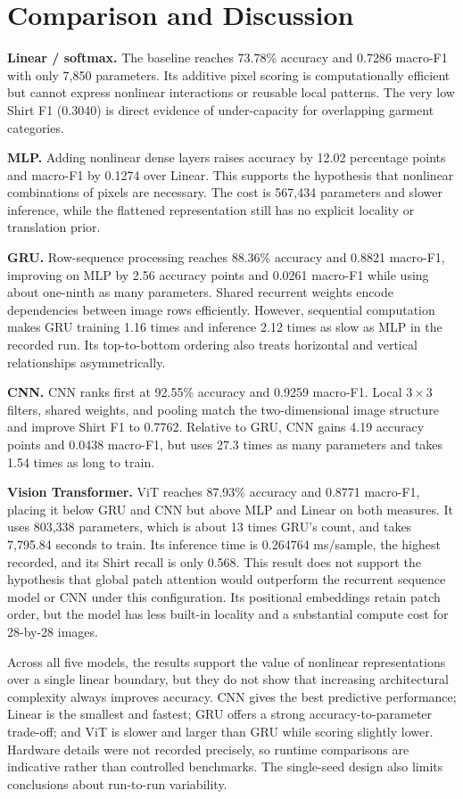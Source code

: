 \section{Comparison and Discussion}

\textbf{Linear / softmax.} The baseline reaches 73.78\% accuracy and 0.7286 macro-F1 with only 7,850 parameters. Its additive pixel scoring is computationally efficient but cannot express nonlinear interactions or reusable local patterns. The very low Shirt F1 (0.3040) is direct evidence of under-capacity for overlapping garment categories.

\textbf{MLP.} Adding nonlinear dense layers raises accuracy by 12.02 percentage points and macro-F1 by 0.1274 over Linear. This supports the hypothesis that nonlinear combinations of pixels are necessary. The cost is 567,434 parameters and slower inference, while the flattened representation still has no explicit locality or translation prior.

\textbf{GRU.} Row-sequence processing reaches 88.36\% accuracy and 0.8821 macro-F1, improving on MLP by 2.56 accuracy points and 0.0261 macro-F1 while using about one-ninth as many parameters. Shared recurrent weights encode dependencies between image rows efficiently. However, sequential computation makes GRU training 1.16 times and inference 2.12 times as slow as MLP in the recorded run. Its top-to-bottom ordering also treats horizontal and vertical relationships asymmetrically.

\textbf{CNN.} CNN ranks first at 92.55\% accuracy and 0.9259 macro-F1. Local $3\times3$ filters, shared weights, and pooling match the two-dimensional image structure and improve Shirt F1 to 0.7762. Relative to GRU, CNN gains 4.19 accuracy points and 0.0438 macro-F1, but uses 27.3 times as many parameters and takes 1.54 times as long to train.

\textbf{Vision Transformer.} ViT reaches 87.93\% accuracy and 0.8771 macro-F1, placing it below GRU and CNN but above MLP and Linear on both measures. It uses 803,338 parameters, which is about 13 times GRU's count, and takes 7,795.84 seconds to train. Its inference time is 0.264764 ms/sample, the highest recorded, and its Shirt recall is only 0.568. This result does not support the hypothesis that global patch attention would outperform the recurrent sequence model or CNN under this configuration. Its positional embeddings retain patch order, but the model has less built-in locality and a substantial compute cost for 28-by-28 images.

Across all five models, the results support the value of nonlinear representations over a single linear boundary, but they do not show that increasing architectural complexity always improves accuracy. CNN gives the best predictive performance; Linear is the smallest and fastest; GRU offers a strong accuracy-to-parameter trade-off; and ViT is slower and larger than GRU while scoring slightly lower. Hardware details were not recorded precisely, so runtime comparisons are indicative rather than controlled benchmarks. The single-seed design also limits conclusions about run-to-run variability.
